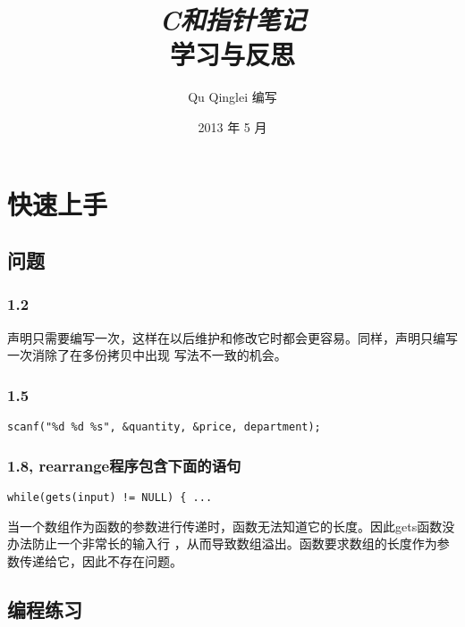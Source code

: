 \documentclass{article}
\begin{document}
\title{%
  {\huge \textit{C和指针笔记}\\\smallskip}%
  {\LARGE \textsf{学习与反思}}
}

\author{Qu Qinglei 编写 \\[3mm]
       }

\date{2013 年 5 月}

\maketitle

\begin{multicols}{2}
\tableofcontents
\end{multicols}

\section{快速上手}
\subsection{问题}
\subsubsection{1.2}
声明只需要编写一次，这样在以后维护和修改它时都会更容易。同样，声明只编写一次消除了在多份拷贝中出现
写法不一致的机会。

\subsubsection{1.5}
\begin{verbatim}
scanf("%d %d %s", &quantity, &price, department);
\end{verbatim}

\subsubsection{1.8, rearrange程序包含下面的语句}
\begin{verbatim}
while(gets(input) != NULL) { ...
\end{verbatim}
当一个数组作为函数的参数进行传递时，函数无法知道它的长度。因此gets函数没办法防止一个非常长的输入行
，从而导致数组溢出。函数要求数组的长度作为参数传递给它，因此不存在问题。

\subsection{编程练习}
\end{document}
